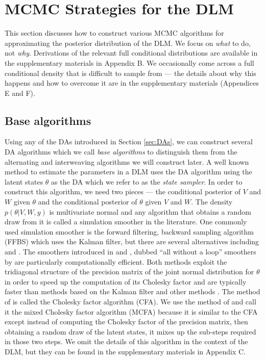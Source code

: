 \documentclass[12pt]{article}
\begin{document}
\section{MCMC Strategies for the DLM}\label{sec:Algs}

This section discusses how to construct various MCMC algorithms for approximating the posterior distribution of the DLM. We focus on {\it what} to do, not {\it why}. Derivations of the relevant full conditional distributions are available in the supplementary materials in Appendix B. We occasionally come across a full conditional density that is difficult to sample from --- the details about why this happens and how to overcome it are in the supplementary materials (Appendices E and F).

\subsection{Base algorithms}\label{sec:Algs:base}
Using any of the DAs introduced in Section \ref{sec:DAs}, we can construct several DA algorithms which we call {\it base algorithms} to distinguish them from the alternating and interweaving algorithms we will construct later. A well known method to estimate the parameters in a DLM uses the DA algorithm using the latent states $\theta$ as the DA \citep{fruhwirth1994data,carter1994gibbs} which we refer to as the {\it state sampler}. In order to construct this algorithm, we need two pieces --- the conditional posterior of $V$ and $W$ given $\theta$ and the conditional posterior of $\theta$ given $V$ and $W$. The density $p(\theta|V,W,y)$ is multivariate normal and any algorithm that obtains a random draw from it is called a simulation smoother in the literature. One commonly used simulation smoother is the forward filtering, backward sampling algorithm (FFBS) \citep{fruhwirth1994data,carter1994gibbs} which uses the Kalman filter, but there are several alternatives including \citet{koopman1993disturbance} and \citet{de1995simulation}. The smoothers introduced in \citet{mccausland2011simulation} and \citet{rue2001fast}, dubbed ``all without a loop'' smoothers by \citet{kastner2013ancillarity} are particularly computationally efficient. Both methods exploit the tridiagonal structure of the precision matrix of the joint normal distribution for $\theta$ in order to speed up the computation of its Cholesky factor and are typically faster than methods based on the Kalman filter and other methods \citep{mccausland2011simulation}. The method of \citet{rue2001fast} is called the Cholesky factor algorithm (CFA). We use the method of \citet{mccausland2011simulation} and call it the mixed Cholesky factor algorithm (MCFA) because it is similar to the CFA except instead of computing the Cholesky factor of the precision matrix, then obtaining a random draw of the latent states, it mixes up the sub-steps required in those two steps. We omit the details of this algorithm in the context of the DLM, but they can be found in the supplementary materials in Appendix C.
\end{document}
